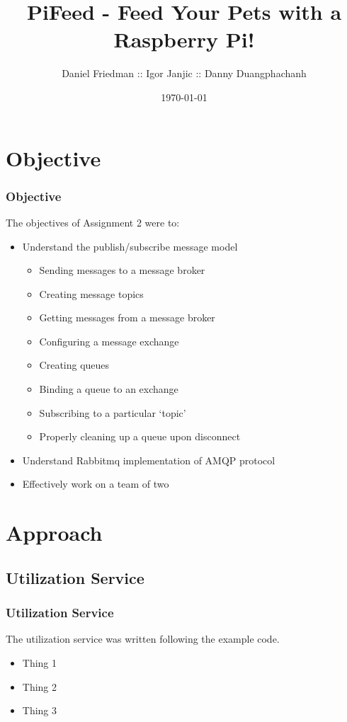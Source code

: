 \documentclass[]{beamer}
\title{PiFeed - Feed Your Pets with a Raspberry Pi!}
\author{Daniel Friedman :: Igor Janjic :: Danny Duangphachanh}
\institute{Virginia Tech}
\date{\today}
\begin{document}
\begin{frame}
  \titlepage
\end{frame}
\note{}


\section{Objective}
\begin{frame}
	\frametitle{Objective}
    The objectives of Assignment 2 were to:
    \begin{itemize}
    	\item Understand the publish/subscribe message model
    	\begin{itemize}
        	\item Sending messages to a message broker
            \item Creating message topics
            \item Getting messages from a message broker
            \item Configuring a message exchange
            \item Creating queues
            \item Binding a queue to an exchange
            \item Subscribing to a particular ‘topic’
            \item Properly cleaning up a queue upon disconnect
        \end{itemize}
       
    	\item Understand Rabbitmq implementation of AMQP protocol
        \item Effectively work on a team of two
	\end{itemize}
\end{frame}



\section{Approach}
\subsection{Utilization Service}
\begin{frame}
	\frametitle{Utilization Service}
    The utilization service was written following the example code.
    \begin{itemize}
    	\item Thing 1
    	\item Thing 2
    	\item Thing 3
	\end{itemize}
\end{frame}
\end{document}

